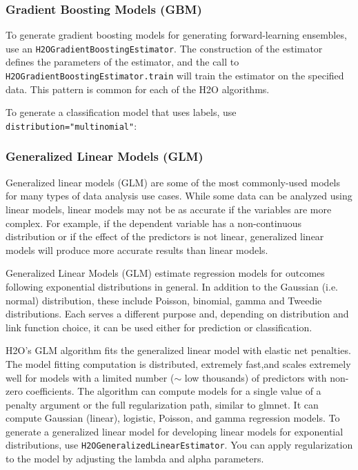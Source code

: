 \subsubsection{Gradient Boosting Models (GBM)}
To generate gradient boosting models for generating forward-learning ensembles,
use an {\texttt{H2OGradientBoostingEstimator}}.  The construction of the estimator
defines the parameters of the estimator, and the call to
{\texttt{H2OGradientBoostingEstimator.train}} will train the estimator on
the specified data.  This pattern is common for each of the H2O algorithms.



To generate a classification model that uses labels, use
{\texttt{distribution="multinomial"}}:



\subsubsection{Generalized Linear Models (GLM)}
Generalized linear models (GLM) are some of the most commonly-used
models for many types of data analysis use cases. While some data
can be analyzed using linear models, linear models
may not be as accurate if the variables are more complex.
For example, if the dependent variable has a non-continuous
distribution or if the effect of the predictors is not linear,
generalized linear models will produce more accurate results than linear models.

Generalized Linear Models (GLM) estimate regression models for
outcomes following exponential distributions in general. In
addition to the Gaussian (i.e. normal) distribution, these include
Poisson, binomial, gamma and Tweedie distributions. Each serves
a different purpose and, depending on distribution and link
function choice, it can be used either for prediction or
classification.

H2O's GLM algorithm fits the generalized linear model with
elastic net penalties. The model fitting computation is distributed,
extremely fast,and scales extremely well for models with a limited
number ($\sim$ low thousands) of predictors with non-zero
coefficients. The algorithm can compute models for a single value of a penalty argument or the full regularization path, similar to glmnet. It can compute Gaussian (linear), logistic, Poisson, and gamma regression models.
To generate a generalized linear model for developing
linear models for exponential distributions, use
{\texttt{H2OGeneralizedLinearEstimator}}. You can apply
regularization to the model by adjusting the lambda and alpha
parameters.

